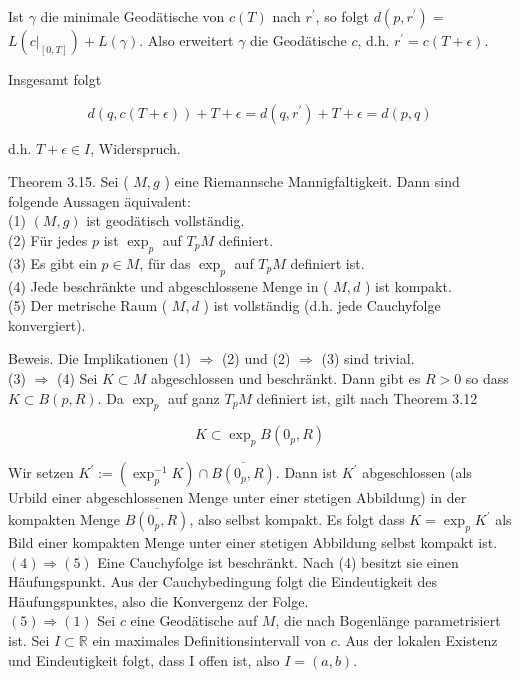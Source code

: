 \documentclass[10pt, letterpaper]{article}
\begin{document}
Ist $\gamma$ die minimale Geodätische von $c(T)$ nach $r^{\prime}$, so folgt $d\left(p, r^{\prime}\right)=$ $L\left(\left.c\right|_{[0, T]}\right)+L(\gamma)$. Also erweitert $\gamma$ die Geodätische $c$, d.h. $r^{\prime}=c(T+\epsilon)$.

Insgesamt folgt

$$
d(q, c(T+\epsilon))+T+\epsilon=d\left(q, r^{\prime}\right)+T+\epsilon=d(p, q)
$$

d.h. $T+\epsilon \in I$, Widerspruch.

Theorem 3.15. Sei ( $M, g$ ) eine Riemannsche Mannigfaltigkeit. Dann sind folgende Aussagen äquivalent:\\
(1) $(M, g)$ ist geodätisch vollständig.\\
(2) Für jedes $p$ ist $\exp _{p}$ auf $T_{p} M$ definiert.\\
(3) Es gibt ein $p \in M$, für das $\exp _{p}$ auf $T_{p} M$ definiert ist.\\
(4) Jede beschränkte und abgeschlossene Menge in ( $M, d$ ) ist kompakt.\\
(5) Der metrische Raum ( $M, d$ ) ist vollständig (d.h. jede Cauchyfolge konvergiert).

Beweis. Die Implikationen (1) $\Longrightarrow$ (2) und (2) $\Longrightarrow$ (3) sind trivial.\\
(3) $\Longrightarrow$ (4) Sei $K \subset M$ abgeschlossen und beschränkt. Dann gibt es $R>0$ so dass $K \subset B(p, R)$. Da $\exp _{p}$ auf ganz $T_{p} M$ definiert ist, gilt nach Theorem 3.12

$$
K \subset \exp _{p} B\left(0_{p}, R\right)
$$

Wir setzen $K^{\prime}:=\left(\exp _{p}^{-1} K\right) \cap \overline{B\left(0_{p}, R\right)}$. Dann ist $K^{\prime}$ abgeschlossen (als Urbild einer abgeschlossenen Menge unter einer stetigen Abbildung) in der kompakten Menge $\overline{B\left(0_{p}, R\right)}$, also selbst kompakt. Es folgt dass $K=\exp _{p} K^{\prime}$ als Bild einer kompakten Menge unter einer stetigen Abbildung selbst kompakt ist.\\
$(4) \Longrightarrow(5)$ Eine Cauchyfolge ist beschränkt. Nach (4) besitzt sie einen Häufungspunkt. Aus der Cauchybedingung folgt die Eindeutigkeit des Häufungspunktes, also die Konvergenz der Folge.\\
$(5) \Longrightarrow(1)$ Sei $c$ eine Geodätische auf $M$, die nach Bogenlänge parametrisiert ist. Sei $I \subset \mathbb{R}$ ein maximales Definitionsintervall von $c$. Aus der lokalen Existenz und Eindeutigkeit folgt, dass I offen ist, also $I=(a, b)$.
\end{document}
